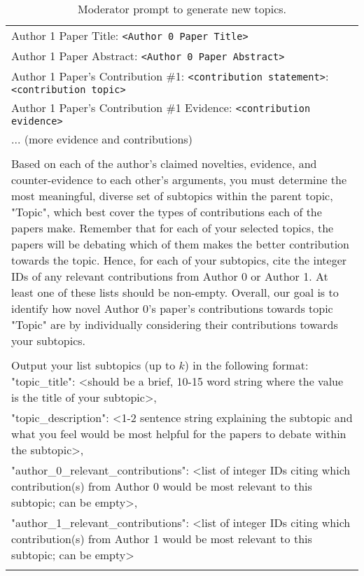 \begin{table*}[h]
\begin{tabularx}{\textwidth}{|X|}
Author 1 Paper Title: \texttt{<Author 0 Paper Title>}\\
Author 1 Paper Abstract: \texttt{<Author 0 Paper Abstract>}\\
Author 1 Paper's Contribution \#1: \texttt{<contribution statement>}: \texttt{<contribution topic>}\\
Author 1 Paper's Contribution \#1 Evidence: \texttt{<contribution evidence>}\\
... (more evidence and contributions)
\\\\
Based on each of the author's claimed novelties, evidence, and counter-evidence to each other's arguments, you must determine the most meaningful, diverse set of subtopics within the parent topic, "Topic", which best cover the types of contributions each of the papers make. Remember that for each of your selected topics, the papers will be debating which of them makes the better contribution towards the topic. Hence, for each of your subtopics, cite the integer IDs of any relevant contributions from Author 0 or Author 1. At least one of these lists should be non-empty. Overall, our goal is to identify how novel Author 0's paper's contributions towards topic "Topic" are by individually considering their contributions towards your subtopics. 
\\\\
Output your list subtopics (up to $k$) in the following format:
    "topic\_title": <should be a brief, 10-15 word string where the value is the title of your subtopic>, \\
    "topic\_description": <1-2 sentence string explaining the subtopic and what you feel would be most helpful for the papers to debate within the subtopic>, \\
    "author\_0\_relevant\_contributions": <list of integer IDs citing which contribution(s) from Author 0 would be most relevant to this subtopic; can be empty>, \\
    "author\_1\_relevant\_contributions": <list of integer IDs citing which contribution(s) from Author 1 would be most relevant to this subtopic; can be empty>\\
 \\ \hline
\end{tabularx}
\caption{Moderator prompt to generate new topics.}
\label{prompt_mod: generate_topics}
\end{table*}

